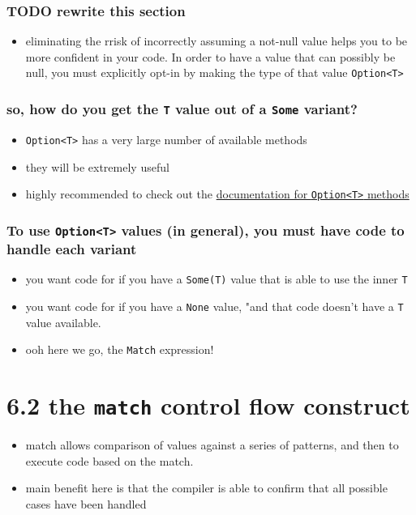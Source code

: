 \documentclass[11pt]{article}
\begin{document}
\subsubsection{{\bfseries\sffamily TODO} rewrite this section}
\label{sec:org40620eb}
\begin{itemize}
\item eliminating the rrisk of incorrectly assuming a not-null value helps you to be more confident in your code. In order to have a value that can possibly be null, you must explicitly opt-in by making the type of that value \texttt{Option<T>}
\end{itemize}
\subsubsection{so, how do you get the \texttt{T} value out of a \texttt{Some} variant?}
\label{sec:org01ffc03}
\begin{itemize}
\item \texttt{Option<T>} has a very large number of available methods
\item they will be extremely useful
\item highly recommended to check out the  \href{https://doc.rust-lang.org/std/option/enum.Option.html}{documentation for \texttt{Option<T>} methods}
\end{itemize}
\subsubsection{To use \texttt{Option<T>} values (in general), you must have code to handle each variant}
\label{sec:org4c9bbf4}
\begin{itemize}
\item you want code for if you have a \texttt{Some(T)} value that is able to use the inner \texttt{T}
\item you want code for if you have a \texttt{None} value, "and that code doesn't have a \texttt{T} value available.
\item ooh here we go, the \texttt{Match} expression!
\end{itemize}
\section{6.2 the \texttt{match} control flow construct}
\label{sec:org5477fd0}
\begin{itemize}
\item match allows comparison of values against a series of patterns, and then to execute code based on the match.
\item main benefit here is that the compiler is able to confirm that all possible cases have been handled
\end{itemize}
\end{document}
